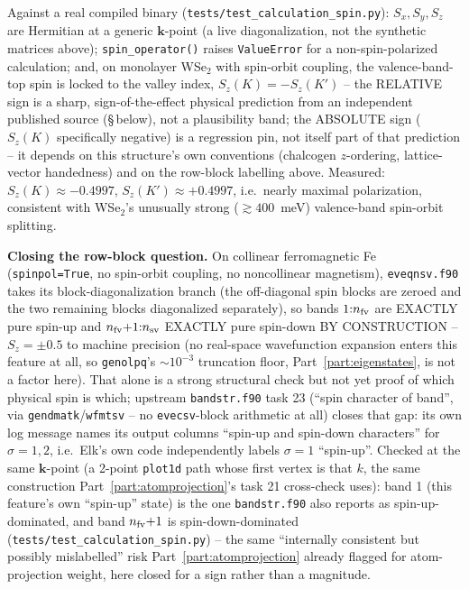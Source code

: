 \documentclass[11pt]{article}
\begin{document}
Against a real compiled binary (\texttt{tests/test\_calculation\_spin.py}): $S_x,S_y,S_z$ are
Hermitian at a generic $\mathbf k$-point (a live diagonalization, not the synthetic matrices
above); \texttt{spin\_operator()} raises \texttt{ValueError} for a non-spin-polarized
calculation; and, on monolayer WSe$_2$ with spin-orbit coupling, the valence-band-top spin is
locked to the valley index, $S_z(K)=-S_z(K')$ -- the RELATIVE sign is a sharp,
sign-of-the-effect physical prediction from an independent published source (\S\,below), not
a plausibility band; the ABSOLUTE sign ($S_z(K)$ specifically negative) is a regression pin,
not itself part of that prediction -- it depends on this structure's own conventions
(chalcogen $z$-ordering, lattice-vector handedness) and on the row-block labelling above.
Measured: $S_z(K)\approx-0.4997$, $S_z(K')\approx+0.4997$, i.e.\ nearly maximal polarization,
consistent with WSe$_2$'s unusually strong ($\gtrsim400$~meV) valence-band spin-orbit
splitting.

\textbf{Closing the row-block question.} On collinear ferromagnetic Fe (\texttt{spinpol=True},
no spin-orbit coupling, no noncollinear magnetism), \texttt{eveqnsv.f90} takes its
block-diagonalization branch (the off-diagonal spin blocks are zeroed and the two remaining
blocks diagonalized separately), so bands $1{:}n_{\rm fv}$ are EXACTLY pure spin-up and
$n_{\rm fv}{+}1{:}n_{\rm sv}$ EXACTLY pure spin-down BY CONSTRUCTION -- $S_z=\pm0.5$ to
machine precision (no real-space wavefunction expansion enters this feature at all, so
\texttt{genolpq}'s $\sim10^{-3}$ truncation floor, Part~\ref{part:eigenstates}, is not a
factor here). That alone is a strong structural check but not yet proof of which physical
spin is which; upstream \texttt{bandstr.f90} task 23 (``spin character of band'', via
\texttt{gendmatk}/\texttt{wfmtsv} -- no \texttt{evecsv}-block arithmetic at all) closes that
gap: its own log message names its output columns ``spin-up and spin-down characters'' for
$\sigma=1,2$, i.e.\ Elk's own code independently labels $\sigma=1$ ``spin-up''. Checked at
the same $\mathbf k$-point (a 2-point \texttt{plot1d} path whose first vertex is that $k$,
the same construction Part~\ref{part:atomprojection}'s task 21 cross-check uses): band 1
(this feature's own ``spin-up'' state) is the one \texttt{bandstr.f90} also reports as
spin-up-dominated, and band $n_{\rm fv}{+}1$ is spin-down-dominated
(\texttt{tests/test\_calculation\_spin.py}) -- the same ``internally consistent but possibly
mislabelled'' risk Part~\ref{part:atomprojection} already flagged for atom-projection
weight, here closed for a sign rather than a magnitude.
\end{document}
